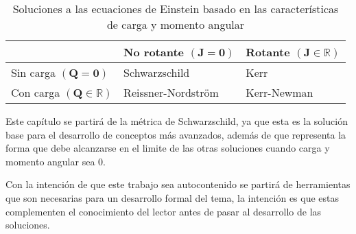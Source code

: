 \begin{table}
    \begin{small}
        \caption{Soluciones a las ecuaciones de Einstein basado en las características de carga y momento angular}
        \begin{center}
\begin{tabular}{|l|l|l|}
\hline & No rotante $(\boldsymbol{J}=\mathbf{0})$ & Rotante $(\boldsymbol{J} \in \mathbb{R})$ \\
\hline Sin carga $(\boldsymbol{Q}=\mathbf{0})$ & Schwarzschild & Kerr \\
\hline Con carga $(\boldsymbol{Q} \in \mathbb{R})$ & Reissner-Nordström & Kerr-Newman \\
\hline
\end{tabular}            
        \end{center}
    \end{small}
\end{table}


Este capítulo se partirá de la métrica de Schwarzschild, ya que esta es la solución base para el desarrollo de conceptos más avanzados, además de que representa la forma que debe alcanzarse en el limite de las otras soluciones cuando carga y momento angular sea $0$.

Con la intención de que este trabajo sea autocontenido se partirá de herramientas que son necesarias para un desarrollo formal del tema, la intención es que estas complementen el conocimiento del lector antes de pasar al desarrollo de las soluciones.







\printbibliography[keyword={BlackHoles},title={Referencias del capítulo}]
